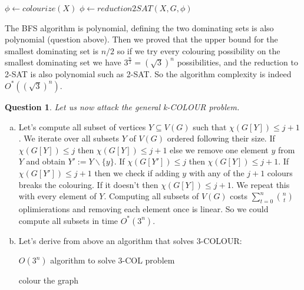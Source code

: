 \documentclass{article}
\newtheorem{Question}[theorem]{Question}
\begin{document}
\begin{enumerate}[(a)]
\begin{algorithm}[H]
\begin{algorithmic}
            \EndIf
            \State $\phi \gets colourize(X)$
            \State $\phi \gets reduction2SAT(X, G, \phi)$
        \end{algorithmic}
    \end{algorithm}
    The BFS algorithm is polynomial, defining the two dominating sets is also polynomial (question above). Then we proved that the upper bound for the smallest dominating set is $n/2$ so if we try every colouring possibility on the smallest dominating set we have $3^{\frac{n}{2}} = (\sqrt{3})^n$ possibilities, and the reduction to 2-SAT is also polynomial such as 2-SAT. So the algorithm complexity is indeed $O^*((\sqrt{3})^n)$.
\end{enumerate}
\begin{Question}
    Let us now attack the general k-COLOUR problem.
\end{Question}
\begin{enumerate}[(a)]
    \item Let's compute all subset of vertices $Y \subseteq V (G)$ such that $\chi(G[Y]) \leq j + 1$. We iterate over all subsets $Y$ of $V(G)$ ordered following their size. If $\chi(G[Y]) \leq j$ then $\chi(G[Y]) \leq j+1$ else we remove one element $y$ from $Y$ and obtain $Y' := Y\backslash \{y\}$. If $\chi(G[Y']) \leq j$ then $\chi(G[Y]) \leq j+1$. If $\chi(G[Y']) \leq j+1$ then we check if adding $y$ with any of the $j+1$ colours breaks the colouring. If it doesn't then $\chi(G[Y]) \leq j+1$. We repeat this with every element of $Y$. Computing all subsets of $V(G)$ costs $\sum\limits_{t=0}^{n}\binom{n}{t}$ oplimierations and removing each element once is linear. So we could compute all subsets in time $O^*(3^n)$.
    \item Let's derive from above an algorithm that solves 3-COLOUR:
    \begin{algorithm}[H]
        \caption{$O(3^n)$ algorithm to solve 3-COL problem}    
        \begin{algorithmic}
            \State colour the graph
        \end{algorithmic}
    \end{algorithm}
\end{enumerate}
\end{document}
